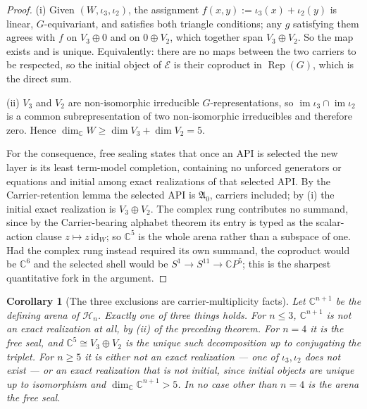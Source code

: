 \documentclass[11pt]{article}
\theoremstyle{plain}
\newtheorem{corollary}[theorem]{Corollary}
\theoremstyle{definition}
\theoremstyle{remark}
\newcommand{\C}{\mathbb{C}}
\begin{document}
\begin{proof}
(i) Given \((W,\iota_3,\iota_2)\), the assignment
\(f(x,y):=\iota_3(x)+\iota_2(y)\) is linear, \(G\)-equivariant, and satisfies
both triangle conditions; any \(g\) satisfying them agrees with \(f\) on
\(V_3\oplus0\) and on \(0\oplus V_2\), which together span \(V_3\oplus V_2\).
So the map exists and is unique.  Equivalently: there are no maps between the
two carriers to be respected, so the initial object of \(\mathcal E\) is their
coproduct in \(\operatorname{Rep}(G)\), which is the direct sum.

(ii) \(V_3\) and \(V_2\) are non-isomorphic irreducible \(G\)-representations,
so \(\operatorname{im}\iota_3\cap\operatorname{im}\iota_2\) is a common
subrepresentation of two non-isomorphic irreducibles and therefore zero.  Hence
\(\dim_\C W\ge\dim V_3+\dim V_2=5\).

For the consequence, free sealing states that once an API is selected the new
layer is its least term-model completion, containing no unforced generators or
equations and initial among exact realizations of that selected API.  By the
Carrier-retention lemma the selected API is \(\mathfrak A_0\), carriers
included; by (i) the initial exact realization is \(V_3\oplus V_2\).  The
complex rung contributes no summand, since by the Carrier-bearing alphabet
theorem its entry is typed as the scalar-action clause
\(z\mapsto z\,\mathrm{id}_W\); so \(\C^5\) is the whole arena rather than a
subspace of one.  Had the complex rung instead required its own summand, the
coproduct would be \(\C^6\) and the selected shell would be
\(S^1\to S^{11}\to\C P^5\); this is the sharpest quantitative fork in the
argument.  \qedhere
\end{proof}

\begin{corollary}[The three exclusions are carrier-multiplicity facts]
Let \(\C^{n+1}\) be the defining arena of \(\mathcal H_n\).  Exactly one of
three things holds.  For \(n\le3\), \(\C^{n+1}\) is not an exact realization at
all, by (ii) of the preceding theorem.  For \(n=4\) it is the free seal, and
\(\C^5\cong V_3\oplus V_2\) is the unique such decomposition up to conjugating
the triplet.  For \(n\ge5\) it is either not an exact realization --- one of
\(\iota_3,\iota_2\) does not exist --- or an exact realization that is not
initial, since initial objects are unique up to isomorphism and
\(\dim_\C\C^{n+1}>5\).  In no case other than \(n=4\) is the arena the free
seal.
\end{corollary}
\end{document}
